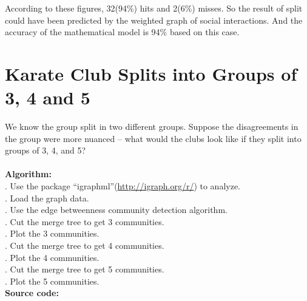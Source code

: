 \documentclass{article}
\begin{document}
		According to these figures, 32(94\%) hits and 2(6\%) misses. So the result of split could have been predicted by the weighted graph of social interactions. And the accuracy of the mathematical model is 94\% based on this case.\\
		\section{Karate Club Splits into Groups of 3, 4 and 5}
		\indent We know the group split in two different groups. Suppose the disagreements in the group were more nuanced -- what would the clubs look like if they split into groups of 3, 4, and 5?\\\\
		\textbf{Algorithm:}\\
		. Use the package ``igraphml''(\url{http://igraph.org/r/}) to analyze.\\
		. Load the graph data.\\
		. Use the edge betweenness community detection algorithm.\\
		. Cut the merge tree to get 3 communities.\\
		. Plot the 3 communities.\\
		. Cut the merge tree to get 4 communities.\\
		. Plot the 4 communities.\\
		. Cut the merge tree to get 5 communities.\\
		. Plot the 5 communities.\\

		\noindent\textbf{Source code:}
		
\end{document}
